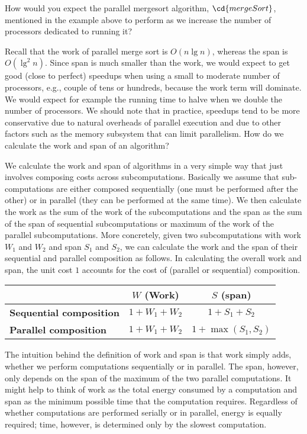 How would you expect the parallel mergesort algorithm, $\cd{mergeSort}$,
mentioned in the example above to perform as we increase the number of
processors dedicated to running it?

Recall that the work of parallel merge sort is $O(n\lg{n})$, whereas
the span is $O(\lg^2{n})$.  
%
Since span is much smaller than the work, we would expect to get good
(close to perfect) speedups when using a small to moderate number of
processors, e.g., couple of tens or hundreds, because the work term
will dominate.
%
We would expect for example the running time to halve when we double
the number of processors.
%
We should note that in practice, speedups tend to be more conservative
due to natural overheads of parallel execution and due to other
factors such as the memory subsystem that can limit parallelism.
How do we calculate the work and span of an algorithm?

We calculate the work and span of algorithms in a very
simple way that just involves composing costs across subcomputations.
%
Basically we assume that sub-computations are either composed
sequentially (one must be performed after the other) or in parallel
(they can be performed at the same time).
%
We then calculate the work as the sum of the work of the
subcomputations and the span as the sum of the span of sequential
subcomputations or maximum of the work of the parallel
subcomputations.
%
More concretely, given two subcomputations with work $W_1$ and $W_2$
and span $S_1$ and $S_2$, we can calculate the work and the span of
their sequential and parallel composition as follows.
%
In calculating the overall work and span, the unit cost $1$ accounts
for the cost of (parallel or sequential) composition.


\begin{center}
\renewcommand{\arraystretch}{1.5}
\begin{tabular}{lcc}
\toprule
                          &  \bf $W$ (Work) & \bf $S$ (span)\\
\midrule
\bf Sequential composition & $1 + W_1 + W_2$ & $1 + S_1+ S_2$\\
\midrule
\bf Parallel composition   & $1 + W_1 + W_2$ & $1 + \max(S_1, S_2)$\\
\bottomrule
\end{tabular}
\end{center}

The intuition behind the definition of work and span is that work
simply adds, whether we perform computations sequentially or in
parallel.  The span, however, only depends on the span of the maximum
of the two parallel computations.  It might help to think of work as
the total energy consumed by a computation and span as the minimum
possible time that the computation requires.  Regardless of whether
computations are performed serially or in parallel, energy is equally
required; time, however, is determined only by the slowest
computation.

